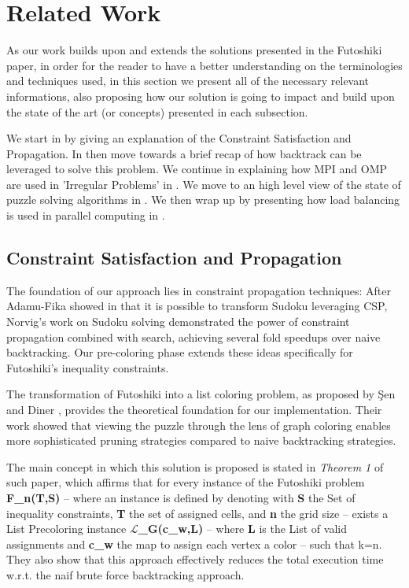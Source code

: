 \section{Related Work}
\label{sec:related_work}
As our work builds upon and extends the solutions presented in the Futoshiki paper, in order for the reader to have a better understanding on the terminologies and techniques used, in this section we present all of the necessary relevant informations, also proposing how our solution is going to impact and build upon the state of the art (or concepts) presented in each subsection. 

We start in  by giving an explanation of the Constraint Satisfaction and Propagation. In  then move towards a brief recap of how backtrack can be leveraged to solve this problem. We continue in explaining how MPI and OMP are used in 'Irregular Problems' in . We move to an high level view of the state of puzzle solving algorithms in . We then wrap up by presenting how load balancing is used in parallel computing in .

\subsection{Constraint Satisfaction and Propagation}
\label{subsec:csp}
The foundation of our approach lies in constraint propagation techniques: After Adamu-Fika showed in \cite{sudoku_csp} that it is possible to transform Sudoku leveraging CSP, Norvig's work on Sudoku solving \cite{NorvigSudoku} demonstrated the power of constraint propagation combined with search, achieving several fold speedups over naive backtracking. Our pre-coloring phase extends these ideas specifically for Futoshiki's inequality constraints.

The transformation of Futoshiki into a list coloring problem, as proposed by Şen and Diner \cite{Sen2024Futoshiki}, provides the theoretical foundation for our implementation. Their work showed that viewing the puzzle through the lens of graph coloring enables more sophisticated pruning strategies compared to naive backtracking strategies. 

The main concept in which this solution is proposed is stated in \textit{Theorem 1} of such paper, which affirms that for every instance of the Futoshiki problem \textbf{F\_n(T,S)} -- where an instance is defined by denoting with \textbf{S} the Set of inequality constraints, \textbf{T} the set of assigned cells, and \textbf{n} the grid size -- exists a List Precoloring instance \textbf{$\mathcal{L}$\_G(c\_w,L)} -- where \textbf{L} is the List of valid assignments and \textbf{c\_w} the map to assign each vertex a color -- such that k=n. They also show that this approach effectively reduces the total execution time w.r.t. the naif brute force backtracking approach.

